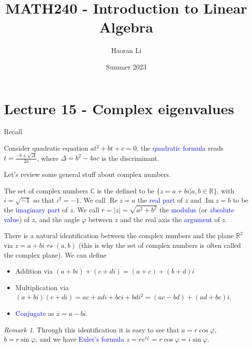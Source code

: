 \documentclass{beamer}
\title{MATH240 - Introduction to Linear Algebra}
\author{Haoran Li}
\institute[UMD]{University of Maryland, College Park}
\date{Summer 2023}
\theoremstyle{definition}
\theoremstyle{remark}
\newtheorem*{remark}{Remark}
\begin{document}
\maketitle

\section{Lecture 15 - Complex eigenvalues}

Recall

\begin{frame}[t]
\begin{theorem}
Consider quadratic equation $at^2+bt+c=0$, the \textcolor{blue}{quadratic formula} reads $t=\frac{-b\pm\sqrt{\Delta}}{2a}$, where $\Delta=b^2-4ac$ is the discriminant.
\end{theorem}
\pause
Let's review some general stuff about complex numbers.

\begin{definition}
The set of complex numbers $\mathbb C$ is the defined to be $\{z=a+bi|a,b\in\mathbb R\}$, with $i=\sqrt{-1}$ so that $i^2=-1$\pause. We call $\operatorname{Re}z=a$ the \textcolor{blue}{real part} of $z$ and $\operatorname{Im}z=b$ to be the \textcolor{blue}{imaginary part} of $z$\pause. We call $r=|z|=\sqrt{a^2+b^2}$ the \textcolor{blue}{modulus} (or \textcolor{blue}{absolute value}) of $z$\pause, and the angle $\varphi$ between $z$ and the real axis the \textcolor{blue}{argument} of $z$.
\end{definition}
\end{frame}

\begin{frame}[t]
\begin{definition}
There is a natural identification between the complex numbers and the plane $\mathbb R^2$ via $z=a+bi\leftrightsquigarrow(a,b)$ (this is why the set of complex numbers is often called the complex plane). We can define
\begin{itemize}
\item Addition via $(a+bi)+(c+di)=(a+c)+(b+d)i$
\item Multiplication via $(a+bi)(c+di)=ac+adi+bci+bdi^2=(ac-bd)+(ad+bc)i$. 
\item \textcolor{blue}{Conjugate} as $\overline z=a-bi$.
\end{itemize}
\end{definition}
\pause
\begin{remark}
Through this identification it is easy to see that $a=r\cos\varphi$, $b=r\sin\varphi$, and we have \textcolor{blue}{Euler's formula} $z=re^{i\varphi}=r\cos\varphi=i\sin\varphi$.
\end{remark}
\end{frame}
\end{document}
